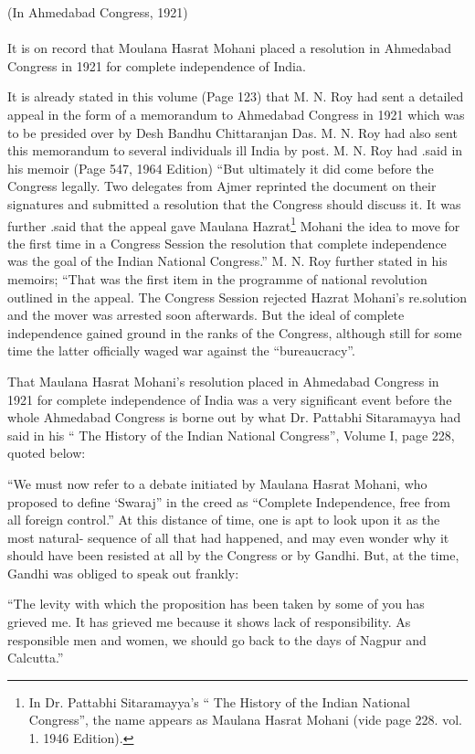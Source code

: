 \noindent(In Ahmedabad Congress, 1921)\\
\\

It is on record that Moulana Hasrat Mohani placed a resolution in Ahmedabad Congress in 1921 for complete independence of India. 

It is already stated in this volume (Page 123) that M. N. Roy had sent a detailed appeal in the form of a memorandum to Ahmedabad Congress in 1921 which was to be presided over by Desh Bandhu Chittaranjan Das. M. N. Roy had also sent this memorandum to several individuals ill India by post. M. N. Roy had .said in his memoir (Page 547, 1964 Edition) “But ultimately it did come before the Congress legally. Two delegates from Ajmer reprinted the document on their signatures and submitted a resolution that the Congress should discuss it. It was further .said that the appeal gave Maulana Hazrat\footnote{ In Dr. Pattabhi Sitaramayya’s “ The History of the Indian National Congress”, the name appears as Maulana Hasrat Mohani (vide page 228. vol. 1. 1946 Edition). } Mohani the idea to move for the first time in a Congress Session the resolution that complete independence was the goal of the Indian National Congress.” M. N. Roy further stated in his memoirs; “That was the first item in the programme of national revolution outlined in the appeal. The Congress Session rejected Hazrat Mohani’s re.solution and the mover was arrested soon afterwards. But the ideal of complete independence gained ground in the ranks of the Congress, although still for some time the latter officially waged war against the “bureaucracy”.

That Maulana Hasrat Mohani's resolution placed in Ahmedabad Congress in 1921 for complete independence of India was a very significant event before the whole Ahmedabad Congress is borne out by what Dr. Pattabhi Sitaramayya had said in his “ The History of the Indian National Congress”, Volume I, page 228, quoted below: 

“We must now refer to a debate initiated by Maulana Hasrat Mohani, who proposed to define ‘Swaraj” in the creed as “Complete Independence, free from all foreign control.” At this distance of time, one is apt to look upon it as the most natural- sequence of all that had happened, and may even wonder why it should have been resisted at all by the Congress or by Gandhi. But, at the time, Gandhi was obliged to speak out frankly: 

“The levity with which the proposition has been taken by some of you has grieved me. It has grieved me because it shows lack of responsibility. As responsible men and women, we should go back to the days of Nagpur and Calcutta.” 

